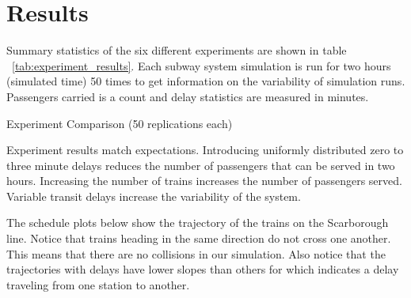 \section{Results}

Summary statistics of the six different experiments are shown in table
~\ref{tab:experiment_results}. Each subway system simulation is run for two
hours (simulated time) 50 times to get information on the variability of
simulation runs. Passengers carried is a count and delay statistics are 
measured in minutes.

\begin{sidewaystable}
    \centering
    \caption{Experiment Comparison (50 replications each)}
    \label{tab:experiment_results}
\end{sidewaystable}

Experiment results match expectations. Introducing uniformly distributed zero
to three minute delays reduces the number of passengers that can be served in
two hours. Increasing the number of trains increases the number of passengers
served. Variable transit delays increase the variability of the system.

The schedule plots below show the trajectory of the trains on the Scarborough
line. Notice that trains heading in the same direction do not cross one
another. This means that there are no collisions in our simulation. Also notice
that the trajectories with delays have lower slopes than others for which
indicates a delay traveling from one station to another.